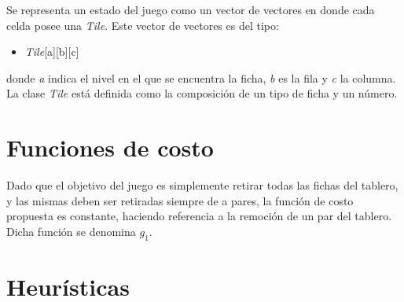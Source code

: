 \documentclass{sig-alternate}
\begin{document}
	Se representa un estado del juego como un vector de vectores en donde cada celda posee una \textit{Tile}. Este vector de vectores es del tipo:
	\begin{itemize}
		\item \textit{Tile}[a][b][c]
	\end{itemize}
	donde \textit{a} indica el nivel en el que se encuentra la ficha, \textit{b} es la fila y \textit{c} la columna. La clase \textit{Tile} est\'a definida como la composici\'on de un tipo de ficha y un n\'umero.
	
\section*{Funciones de costo}

	Dado que el objetivo del juego es simplemente retirar todas las fichas del tablero, y las mismas deben ser retiradas siempre de a pares, la funci\'on de costo propuesta es constante, haciendo referencia a la remoci\'on de un par del tablero. Dicha funci\'on se denomina \textit{$g_1$}. \\
	
	\section*{Heur\'isticas}
\end{document}
